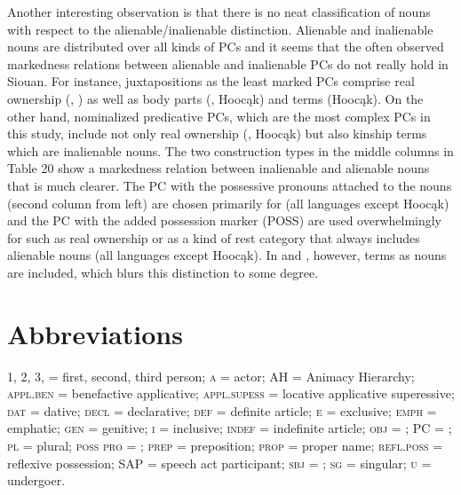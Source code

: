 \documentclass[output=paper]{LSP/langsci}
\begin{document}
Another interesting observation is that there is no neat classification of nouns with respect to the alienable/inalienable distinction. Alienable and inalienable nouns are distributed over all kinds of PCs and it seems that the often observed markedness relations between alienable and inalienable PCs do not really hold in Siouan. For instance, juxtapositions as the least marked PCs comprise real ownership (, ) as well as body parts (, Hoocąk) and  terms (Hoocąk). On the other hand, nominalized predicative PCs, which are the most complex PCs in this study, include not only real ownership (, Hoocąk) but also kinship terms which are inalienable nouns. The two construction types in the middle columns in Table 20 show a markedness relation between inalienable and alienable nouns that is much clearer. The PC with the possessive pronouns attached to the  nouns (second column from left) are chosen primarily for  (all languages except Hoocąk) and the PC with the added possession marker (\textsc{POSS}) are used overwhelmingly for  such as real ownership or as a kind of rest category that always includes alienable nouns (all languages except Hoocąk). In  and , however,  terms as  nouns are included, which blurs this distinction to some degree. 
 
   
\section*{Abbreviations}

1, 2, 3, = first, second, third person; \textsc{a} = actor; AH = Animacy Hierarchy; \textsc{appl.ben} = benefactive applicative; \textsc{appl.supess} = locative applicative superessive; \textsc{dat} = dative; \textsc{decl} = declarative; \textsc{def} = definite article; \textsc{e} = exclusive; \textsc{emph} = emphatic; \textsc{gen} = genitive; \textsc{i} = inclusive; \textsc{indef} = indefinite article; \textsc{obj} = ; PC = ; \textsc{pl} = plural; \textsc{poss pro} = ; \textsc{prep} = preposition; \textsc{prop} = proper name; \textsc{refl.poss} = reflexive possession; SAP = speech act participant; \textsc{sbj} = ; \textsc{sg} = singular; \textsc{u} = undergoer.
 \printbibliography[heading=subbibliography,notkeyword=this]
 
\end{document}
